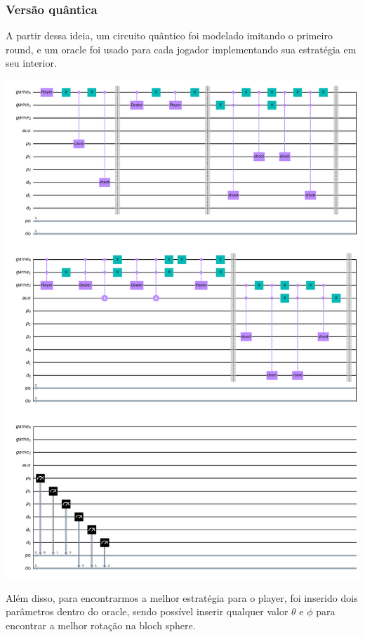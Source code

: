 \documentclass{article}
\begin{document}
\subsubsection{Versão quântica}

A partir dessa ideia, um circuito quântico foi modelado imitando o primeiro round, e um oracle foi usado para cada jogador implementando sua estratégia em seu interior.

\begin{center}
	\includegraphics[scale=0.3]{quantum_buckshot_roulette.png}
	\label{fig:bckr-circuit}
\end{center}

Além disso, para encontrarmos a melhor estratégia para o player, foi inserido dois parâmetros dentro do oracle, sendo possível inserir qualquer valor $\theta$ e $\phi$ para encontrar a melhor rotação na bloch sphere. 
\end{document}
